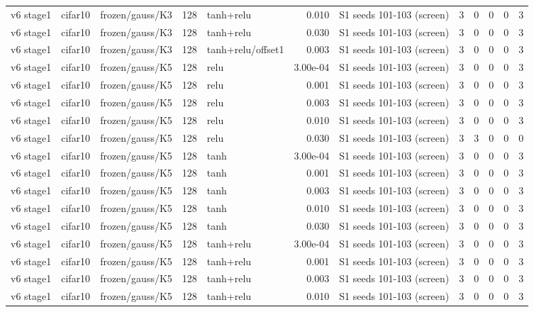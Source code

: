 \begin{table}[htbp]
{\begin{tabular}{@{}lllrlrlrrrrr@{}}
v6 stage1 & cifar10 & frozen/gauss/K3 & 128 & tanh+relu & 0.010 & S1 seeds 101-103 (screen) & 3 & 0 & 0 & 0 & 3 \\
v6 stage1 & cifar10 & frozen/gauss/K3 & 128 & tanh+relu & 0.030 & S1 seeds 101-103 (screen) & 3 & 0 & 0 & 0 & 3 \\
v6 stage1 & cifar10 & frozen/gauss/K3 & 128 & tanh+relu/offset1 & 0.003 & S1 seeds 101-103 (screen) & 3 & 0 & 0 & 0 & 3 \\
v6 stage1 & cifar10 & frozen/gauss/K5 & 128 & relu & 3.00e-04 & S1 seeds 101-103 (screen) & 3 & 0 & 0 & 0 & 3 \\
v6 stage1 & cifar10 & frozen/gauss/K5 & 128 & relu & 0.001 & S1 seeds 101-103 (screen) & 3 & 0 & 0 & 0 & 3 \\
v6 stage1 & cifar10 & frozen/gauss/K5 & 128 & relu & 0.003 & S1 seeds 101-103 (screen) & 3 & 0 & 0 & 0 & 3 \\
v6 stage1 & cifar10 & frozen/gauss/K5 & 128 & relu & 0.010 & S1 seeds 101-103 (screen) & 3 & 0 & 0 & 0 & 3 \\
v6 stage1 & cifar10 & frozen/gauss/K5 & 128 & relu & 0.030 & S1 seeds 101-103 (screen) & 3 & 3 & 0 & 0 & 0 \\
v6 stage1 & cifar10 & frozen/gauss/K5 & 128 & tanh & 3.00e-04 & S1 seeds 101-103 (screen) & 3 & 0 & 0 & 0 & 3 \\
v6 stage1 & cifar10 & frozen/gauss/K5 & 128 & tanh & 0.001 & S1 seeds 101-103 (screen) & 3 & 0 & 0 & 0 & 3 \\
v6 stage1 & cifar10 & frozen/gauss/K5 & 128 & tanh & 0.003 & S1 seeds 101-103 (screen) & 3 & 0 & 0 & 0 & 3 \\
v6 stage1 & cifar10 & frozen/gauss/K5 & 128 & tanh & 0.010 & S1 seeds 101-103 (screen) & 3 & 0 & 0 & 0 & 3 \\
v6 stage1 & cifar10 & frozen/gauss/K5 & 128 & tanh & 0.030 & S1 seeds 101-103 (screen) & 3 & 0 & 0 & 0 & 3 \\
v6 stage1 & cifar10 & frozen/gauss/K5 & 128 & tanh+relu & 3.00e-04 & S1 seeds 101-103 (screen) & 3 & 0 & 0 & 0 & 3 \\
v6 stage1 & cifar10 & frozen/gauss/K5 & 128 & tanh+relu & 0.001 & S1 seeds 101-103 (screen) & 3 & 0 & 0 & 0 & 3 \\
v6 stage1 & cifar10 & frozen/gauss/K5 & 128 & tanh+relu & 0.003 & S1 seeds 101-103 (screen) & 3 & 0 & 0 & 0 & 3 \\
v6 stage1 & cifar10 & frozen/gauss/K5 & 128 & tanh+relu & 0.010 & S1 seeds 101-103 (screen) & 3 & 0 & 0 & 0 & 3 \\

\end{tabular}}
\end{table}
